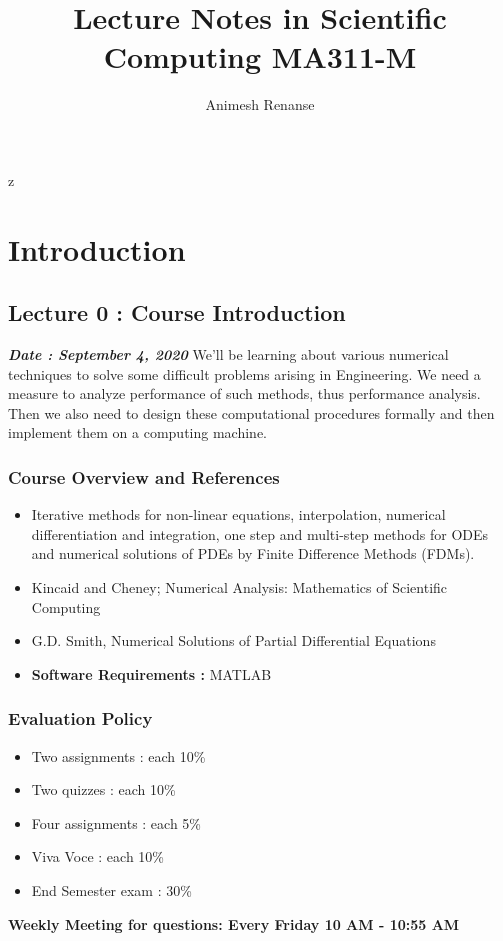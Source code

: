 z\documentclass[a4paper,12pt,twoside]{book}
\title{Lecture Notes in Scientific Computing MA311-M}
\author{Animesh Renanse}
\affil{Department of Electrical \& Electronics Engineering, Indian Institute of Technology, Guwahati}
\begin{document}
	\maketitle
	\thispagestyle{empty}
	\tableofcontents
\chapter{Introduction}
\section{Lecture 0 : Course Introduction}
\textbf{\textit{Date : September 4, 2020}}
\newline\newline
We'll be learning about various numerical techniques to solve some difficult problems arising in Engineering. We need a measure to analyze performance of such methods, thus performance analysis. Then we also need to design these computational procedures formally and then implement them on a computing machine.
\subsection{Course Overview and References}
\begin{itemize}
	\item {Iterative methods for non-linear equations, interpolation, numerical differentiation and integration, one step and multi-step methods for ODEs and numerical solutions of PDEs by Finite Difference Methods (FDMs).}
	\item{Kincaid and Cheney; Numerical Analysis: Mathematics of Scientific Computing }
	\item{G.D. Smith, Numerical Solutions of Partial Differential Equations}
	\item{\textbf{Software Requirements : }MATLAB}
\end{itemize}
\subsection{Evaluation Policy}
\begin{itemize}
	\item {Two assignments : each 10\% }
	\item{Two quizzes : each 10\%}
	\item{Four assignments : each 5\%}
	\item{Viva Voce : each 10\%}
	\item{End Semester exam : 30\%}
\end{itemize}
\textbf{Weekly Meeting for questions: Every Friday 10 AM - 10:55 AM}
\end{document}
